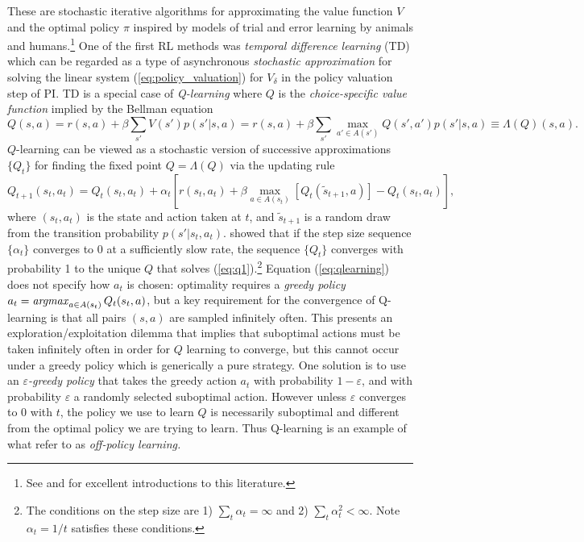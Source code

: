 These are stochastic iterative algorithms for approximating the value function $V$ and the optimal
policy $\pi$ inspired by models of trial and error learning by animals and 
humans.\footnote{\footnotesize  See \citet{BartoSutton:2020} and \citet{bertsekas:2025}
for excellent introductions to this literature.}
One of the first RL methods was 
{\it temporal difference learning\/} (TD) \citep{sutton:1988} which can be regarded as a type of asynchronous 
{\it stochastic approximation\/} \citep{robbinsmunro:1951} for solving the linear system (\ref{eq:policy_valuation}) for
$V_\delta$ in the policy valuation step of PI. TD is a special case of  
{\it Q-learning\/} \citep{Watkins:1989} where $Q$ is the {\it choice-specific value function\/} implied by the  Bellman equation
\begin{equation}
 \label{eq:q1}  
      Q(s,a)  =  r(s,a) + \beta \sum_{s'} V(s')p(s'|s,a)
  = r(s,a)+\beta \sum_{s'} \max_{a' \in A(s')} Q(s',a')p(s'|s,a) \equiv \Lambda(Q)(s,a).
\end{equation}
$Q$-learning can be viewed as a stochastic version of successive approximations 
$\{Q_t\}$ for finding the fixed point $Q=\Lambda(Q)$ via the updating rule
\begin{equation}
   Q_{t+1}(s_t,a_t)= Q_t(s_t,a_t) + \alpha_t \left[ r(s_t,a_t)+\beta \max_{a \in A(s_t)}[Q_t(\tilde s_{t+1},a)] - Q_t(s_t,a_t) \right],
\label{eq:qlearning}
\end{equation}
where $(s_t,a_t)$ is the state and action taken at  $t$, and $\tilde s_{t+1}$ is a random draw from the transition probability
$p(s'|s_t,a_t)$. \citet{Tsitsiklis:1994}
showed that if the step size sequence $\{\alpha_t\}$ converges to 0 at a sufficiently slow rate, the sequence $\{Q_t\}$ converges with probability 1 
to the unique $Q$ that solves (\ref{eq:q1}).\footnote{\footnotesize  \label{fn:step_size}
The conditions on the step size are 1) $\sum_t \alpha_t = \infty$
and 2) $\sum_t \alpha_t^2 < \infty$. Note $\alpha_t=1/t$ satisfies these conditions.}
Equation (\ref{eq:qlearning}) does not specify how  $a_t$ is chosen: optimality requires a {\it greedy policy\/}
$a_t = \mathop{\it argmax}_{a \in A(s_t)} Q_t(s_t,a)$, but a key requirement for the convergence of Q-learning is 
that all pairs $(s,a)$ are sampled infinitely often. This presents an exploration/exploitation 
dilemma that implies that suboptimal actions must
be taken infinitely often in order for $Q$ learning to converge, but this
cannot occur under a greedy policy which is generically a pure strategy.  
One solution is to use an {\it $\varepsilon$-greedy policy\/} that takes the greedy action $a_t$
 with probability $1-\varepsilon$, and with probability $\varepsilon$ a randomly selected 
suboptimal action. However unless $\varepsilon$ converges
to $0$ with $t$, the policy we use to learn $Q$ is necessarily suboptimal and different from the optimal policy  we are trying to learn.
Thus Q-learning is an example of what \citet{BartoSutton:2020} refer  to as  {\it off-policy learning.\/}

